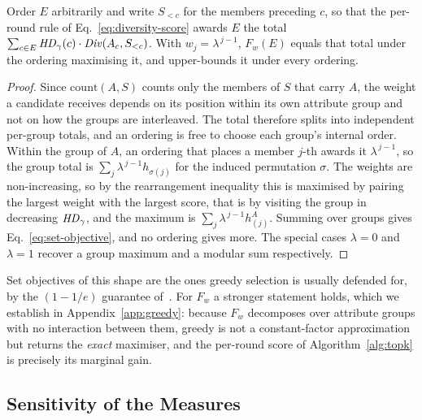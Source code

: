 \begin{proposition}
\label{prop:setobj}
Order $E$ arbitrarily and write $S_{<c}$ for the members preceding $c$, so that the per-round rule of Eq.~\eqref{eq:diversity-score} awards $E$ the total $\sum_{c\in E}\mathit{HD}_\gamma(c)\cdot\mathit{Div}(A_c,S_{<c})$.
With $w_j=\lambda^{\,j-1}$, $F_w(E)$ equals that total under the ordering maximising it, and upper-bounds it under every ordering.
\end{proposition}

\begin{proof}
Since $\mathrm{count}(A,S)$ counts only the members of $S$ that carry $A$, the weight a candidate receives depends on its position within its own attribute group and not on how the groups are interleaved.
The total therefore splits into independent per-group totals, and an ordering is free to choose each group's internal order.
Within the group of $A$, an ordering that places a member $j$-th awards it $\lambda^{\,j-1}$, so the group total is $\sum_j \lambda^{\,j-1}h_{\sigma(j)}$ for the induced permutation $\sigma$.
The weights are non-increasing, so by the rearrangement inequality this is maximised by pairing the largest weight with the largest score, that is by visiting the group in decreasing $\mathit{HD}_\gamma$, and the maximum is $\sum_j \lambda^{\,j-1}h^A_{(j)}$.
Summing over groups gives Eq.~\eqref{eq:set-objective}, and no ordering gives more.
The special cases $\lambda=0$ and $\lambda=1$ recover a group maximum and a modular sum respectively.
\end{proof}

Set objectives of this shape are the ones greedy selection is usually defended for, by the $(1-1/e)$ guarantee of~\cite{NemhauserWF78}.
For $F_w$ a stronger statement holds, which we establish in Appendix~\ref{app:greedy}: because $F_w$ decomposes over attribute groups with no interaction between them, greedy is not a constant-factor approximation but returns the \emph{exact} maximiser, and the per-round score of Algorithm~\ref{alg:topk} is precisely its marginal gain.

\subsection{Sensitivity of the Measures}
\label{subsec:ideal-sensitivity}

